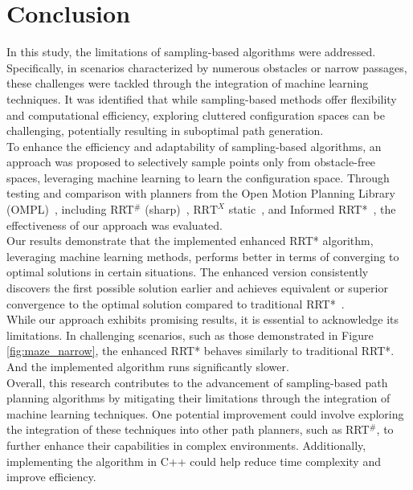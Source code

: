 \documentclass{ctuthesis}
\begin{document}
\chapter{Conclusion} 
\label{chap:Conclusion}
In this study, the limitations of sampling-based algorithms were addressed. 
Specifically, in scenarios characterized by numerous obstacles or narrow passages, 
these challenges were tackled through the integration of machine learning techniques.
It was identified that while sampling-based methods offer flexibility and 
computational efficiency, exploring cluttered configuration spaces can be challenging, 
potentially resulting in suboptimal path generation.
\\[12pt]
To enhance the efficiency and adaptability of sampling-based algorithms, 
an approach was proposed to selectively sample points only from obstacle-free spaces, 
leveraging machine learning to learn the configuration space.
Through testing and comparison with planners from the Open Motion Planning Library (OMPL)~\cite{Ioan2012ompl}, 
including RRT$^\#$ (sharp)~\cite{arslan2012rrtsharp}, $\text{RRT}^X$ static~\cite{Otte2015RRTX}, 
and Informed RRT*~\cite{Gammell2018InformedRRTstar}, 
the effectiveness of our approach was evaluated.
\\[12pt]
Our results demonstrate that the implemented enhanced RRT* algorithm, 
leveraging machine learning methods, 
performs better in terms of converging to optimal solutions in certain situations. 
The enhanced version consistently discovers the first possible solution earlier 
and achieves equivalent or superior convergence to 
the optimal solution compared to traditional RRT*~\cite{karaman2011rrtstar}.
\\[12pt]
While our approach exhibits promising results, 
it is essential to acknowledge its limitations. 
In challenging scenarios, such as those demonstrated in Figure \ref{fig:maze_narrow}, 
the enhanced RRT* behaves similarly to traditional RRT*. 
And the implemented algorithm runs significantly slower.
\\[12pt]
Overall, 
this research contributes to the advancement of sampling-based path planning algorithms 
by mitigating their limitations through the integration of machine learning techniques. 
One potential improvement could involve exploring the integration of these techniques 
into other path planners, such as RRT$^\#$, 
to further enhance their capabilities in complex environments. 
Additionally, 
implementing the algorithm in C++ could help reduce time complexity and improve efficiency.
\end{document}
